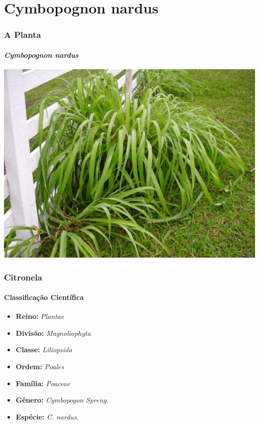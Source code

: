\documentclass[aspectratio=169]{beamer}
\begin{document}
\section{Cymbopognon nardus}
\begin{frame}
\frametitle{A Planta}
\framesubtitle{\emph{Cymbopognon nardus}}

\includegraphics[scale=0.2]{imgs/citronela.jpg} 

\end{frame}

\begin{frame}
\frametitle{Citronela}
\framesubtitle{Classificação Científica}
	
	\begin{itemize}

		\item \textbf{Reino:}	\emph{Plantae} \pause
	
		\item \textbf{Divisão:} \emph{Magnoliophyta} \pause
	
		\item \textbf{Classe:}	\emph{Liliopsida} \pause
	
		\item \textbf{Ordem:}	\emph{Poales} \pause
	
		\item \textbf{Família:}	 \emph{Poaceae} \pause
	
		\item \textbf{Gênero:}	\emph{Cymbopogon Spreng.} \pause
	
		\item \textbf{Espécie:}	 \emph{C. nardus.}

	\end{itemize}

\end{frame}
\end{document}
